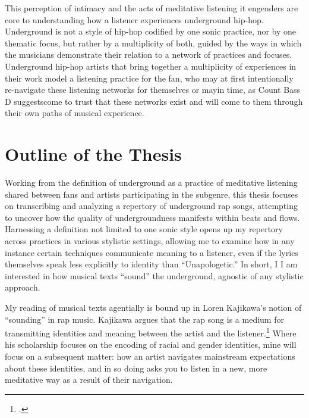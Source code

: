 This perception of intimacy and the acts of meditative listening it engenders are core to 
understanding how a listener experiences underground hip-hop. Underground is not a style of 
hip-hop codified by one sonic practice, nor by one thematic focus, but rather by a multiplicity 
of both, guided by the ways in which the musicians demonstrate their relation to a network of 
practices and focuses. Underground hip-hop artists that bring together a multiplicity of 
experiences in their work model a listening practice for the fan, who may at first intentionally
re-navigate these listening networks for themselves or may\textemdash in time, as Count Bass D 
suggests\textemdash come to trust that these networks exist and will come to them through 
their own paths of musical experience.


\section{Outline of the Thesis}

Working from the definition of underground as a practice of meditative listening shared between
fans and artists participating in the subgenre, this thesis focuses on transcribing and analyzing
a repertory of underground rap songs, attempting to uncover how the quality of undergroundness
manifests within beats and flows. Harnessing a definition not limited to one sonic style opens 
up my repertory across practices in various stylistic settings, allowing me to examine how in
any instance certain techniques communicate meaning to a listener, even if the lyrics themselves
speak less explicitly to identity than ``Unapologetic.'' In short, I I am interested in how musical
texts ``sound'' the underground, agnostic of any stylistic approach.

My reading of musical texts agentially is bound up in Loren Kajikawa's notion of ``sounding'' in
rap music. Kajikawa argues that the rap song is a medium for transmitting identities and meaning 
between the artist and the listener.\footnote{
    \autocite[2]{lorenkajikawaSoundingRaceRap2015}.}
Where his scholarship focuses on the encoding of racial and gender identities, mine will focus on
a subsequent matter: how an artist navigates mainstream expectations about these identities, and 
in so doing asks you to listen in a new, more meditative way as a result of their navigation.

